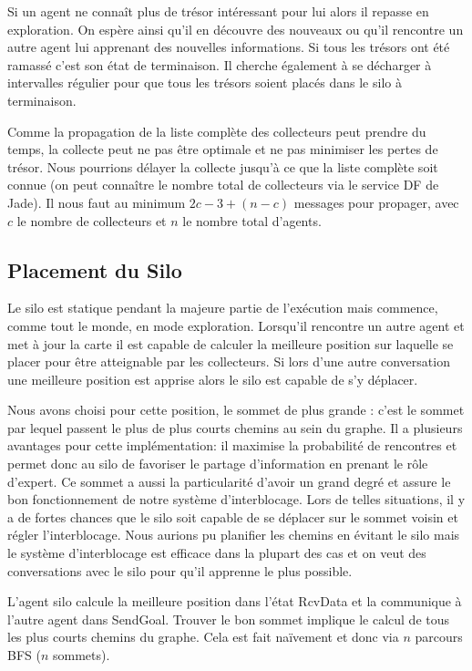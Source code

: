 \documentclass[11pt]{article}
\begin{document}
Si un agent ne connaît plus de trésor intéressant pour lui alors il repasse en exploration. On espère ainsi qu'il en découvre des nouveaux ou qu'il rencontre un autre agent lui apprenant des nouvelles informations. Si tous les trésors ont été ramassé c'est son état de terminaison. Il cherche également à se décharger à intervalles régulier pour que tous les trésors soient placés dans le silo à terminaison.

Comme la propagation de la liste complète des collecteurs peut prendre du temps, la collecte peut ne pas être optimale et ne pas minimiser les pertes de trésor. Nous pourrions délayer la collecte jusqu'à ce que la liste complète soit connue (on peut connaître le nombre total de collecteurs via le service DF de Jade). Il nous faut au minimum $2c - 3 + (n-c)$ messages pour propager, avec $c$ le nombre de collecteurs et $n$ le nombre total d'agents.

\subsection{Placement du Silo}

Le silo est statique pendant la majeure partie de l'exécution mais commence, comme tout le monde, en mode exploration. Lorsqu'il rencontre un autre agent et met à jour la carte il est capable de calculer la meilleure position sur laquelle se placer pour être atteignable par les collecteurs. Si lors d'une autre conversation une meilleure position est apprise alors le silo est capable de s'y déplacer. 

Nous avons choisi pour cette position, le sommet de plus grande : c'est le sommet par lequel passent le plus de plus courts chemins au sein du graphe. Il a plusieurs avantages pour cette implémentation: il maximise la probabilité de rencontres et permet donc au silo de favoriser le partage d'information en prenant le rôle d'expert. Ce sommet a aussi la particularité d'avoir un grand degré et assure le bon fonctionnement de notre système d'interblocage. Lors de telles situations, il y a de fortes chances que le silo soit capable de se déplacer sur le sommet voisin et régler l'interblocage. Nous aurions pu planifier les chemins en évitant le silo mais le système d'interblocage est efficace dans la plupart des cas et on veut des conversations avec le silo pour qu'il apprenne le plus possible.

L'agent silo calcule la meilleure position dans l'état \textsf{RcvData} et la communique à l'autre agent dans \textsf{SendGoal}. Trouver le bon sommet implique le calcul de tous les plus courts chemins du graphe. Cela est fait naïvement et donc via $n$ parcours BFS ($n$ sommets).
\end{document}
